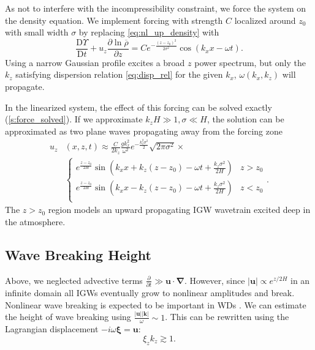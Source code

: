 \documentclass[
        fleqn,
        usenatbib,
        referee,
    ]{mnras}
\newcommand*{\pd}[2]{\frac{\partial#1}{\partial#2}}
\newcommand*{\md}[2]{\frac{\mathrm{D}#1}{\mathrm{D}#2}}
\newcommand*{\abs}[1]{\left|#1\right|}
\newcommand*{\p}[1]{\left(#1\right)}
\newcommand*{\bm}[1]{\mathbf{#1}}
\begin{document}
As not to interfere with the incompressibility constraint, we force the system
on the density equation. We implement forcing with strength $C$ localized around
$z_0$ with small width $\sigma$ by replacing \autoref{eq:nl_up_density} with
\begin{equation}
    \md{\Upsilon}{t} + u_{z}\pd{\ln \overline{\rho}}{z}
        = Ce^{-\frac{(z - z_0)^2}{2\sigma^2}}
            \cos \p{k_{x}x - \omega t}.\label{eq:vol_drive}
\end{equation}
Using a narrow Gaussian profile excites a broad $z$ power spectrum, but only the
$k_{z}$ satisfying dispersion relation \autoref{eq:disp_rel} for the given
$k_{x}$, $\omega(k_{x}, k_{z})$ will propagate.

In the linearized system, the effect of this forcing can be solved exactly
(\autoref{s:force_solved}). If we approximate $k_zH \gg 1, \sigma \ll H$, the
solution can be approximated as two plane waves propagating away from the
forcing zone
\begin{align}
    u_{z}&(x, z, t) \approx{} \frac{C}{2k_z}\frac{gk_x^2}{\omega^2}
        e^{-\frac{k_z^2\sigma^2}{2}}
        \sqrt{2\pi \sigma^2} \times\nonumber\\
        &{}\begin{cases}
        e^{\frac{z - z_0}{2H}}\sin\p{k_{x}x + k_{z}(z - z_0) - \omega t
            + \frac{k_z\sigma^2}{2H}}
            & z > z_0\\
        e^{\frac{z - z_0}{2H}}\sin\p{k_{x}x - k_{z}(z - z_0) - \omega t
            + \frac{k_z\sigma^2}{2H}}
            & z < z_0\\
    \end{cases}.\label{eq:uz_lin}
\end{align}
The $z > z_0$ region models an upward propagating IGW wavetrain excited deep
in the atmosphere.

\subsection{Wave Breaking Height}\label{ss:wave_breaking}

Above, we neglected advective terms $\pd{}{t} \gg \bm{u} \cdot \bm{\nabla}$.
However, since $\abs{\bm{u}} \propto e^{z/2H}$ in an infinite domain all IGWs
eventually grow to nonlinear amplitudes and break. Nonlinear wave breaking is
expected to be important in WDs \citep{fullerI,fullerII}. We can
estimate the height of wave breaking using $\frac{\abs{\bm{u}}
\abs{\bm{k}}}{\omega} \sim 1$. This can be rewritten using the Lagrangian
displacement $-i\omega \bm{\xi} = \bm{u}$:
\begin{equation}
    \xi_z k_z \gtrsim 1.\label{eq:nl}
\end{equation}
\end{document}
